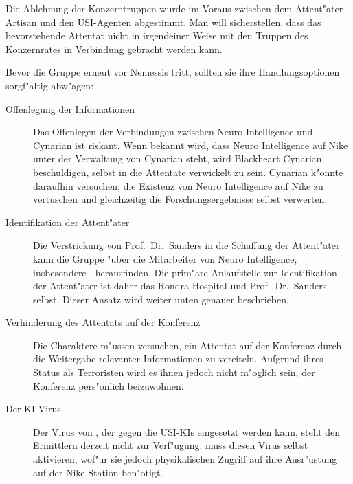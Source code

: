\begin{remarks}
	Die Ablehnung der Konzerntruppen wurde im Voraus zwischen dem Attent"ater Artisan und den USI-Agenten abgestimmt. Man will sicherstellen, dass das bevorstehende Attentat nicht in irgendeiner Weise mit den Truppen des Konzernrates in Verbindung gebracht werden kann.
\end{remarks}


Bevor die Gruppe erneut vor Nemessis tritt, sollten sie ihre Handlungsoptionen sorgf"altig abw"agen:

\begin{description}
	\item[Offenlegung der Informationen] Das Offenlegen der Verbindungen zwischen Neuro Intelligence und Cynarian ist riskant. Wenn bekannt 
		wird, dass Neuro Intelligence auf Nike unter der Verwaltung von Cynarian steht, wird Blackheart Cynarian beschuldigen, selbst in die Attentate verwickelt zu sein. Cynarian k"onnte daraufhin versuchen, die Existenz von Neuro Intelligence auf Nike zu vertuschen und gleichzeitig die Forschungsergebnisse selbst verwerten.
	\item[Identifikation der Attent"ater] Die Verstrickung von Prof.~Dr.~Sanders in die Schaffung der Attent"ater kann die Gruppe "uber die 
		Mitarbeiter von Neuro Intelligence, insbesondere \ml{}, herausfinden. Die prim"are Anlaufstelle zur Identifikation der Attent"ater ist daher das Rondra Hospital und Prof.~Dr.~Sanders selbst. Dieser Ansatz wird weiter unten genauer beschrieben.		
	\item[Verhinderung des Attentats auf der Konferenz] Die Charaktere m"ussen versuchen, ein Attentat auf der Konferenz durch die 
		Weitergabe relevanter Informationen zu vereiteln. Aufgrund ihres Status als Terroristen wird es ihnen jedoch nicht m"oglich sein, der Konferenz pers"onlich beizuwohnen.
	\item[Der KI-Virus] Der Virus von \ml{}, der gegen die USI-KIs eingesetzt werden kann, steht den Ermittlern derzeit nicht zur 
		Verf"ugung. \ml{} muss diesen Virus selbst aktivieren, wof"ur sie jedoch physikalischen Zugriff auf ihre Ausr"ustung auf der Nike Station ben"otigt.
\end{description}


